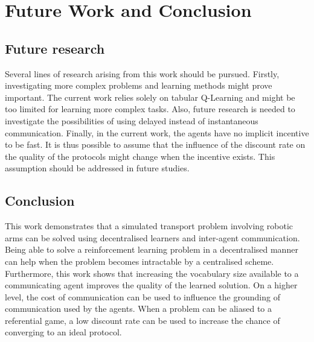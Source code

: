 \chapter{Future Work and Conclusion}
\label{chap:conclusion}

\section{Future research}

Several lines of research arising from this work should be pursued. Firstly, investigating more complex problems and learning methods might prove important. The current work relies solely on tabular Q-Learning and might be too limited for learning more complex tasks. Also, future research is needed to investigate the possibilities of using delayed instead of instantaneous communication. Finally, in the current work, the agents have no implicit incentive to be fast. It is thus possible to assume that the influence of the discount rate on the quality of the protocols might change when the incentive exists. This assumption should be addressed in future studies.

\section{Conclusion}

This work demonstrates that a simulated transport problem involving robotic arms can be solved using decentralised learners and inter-agent communication. Being able to solve a reinforcement learning problem in a decentralised manner can help when the problem becomes intractable by a centralised scheme. Furthermore, this work shows that increasing the vocabulary size available to a communicating agent improves the quality of the learned solution. On a higher level, the cost of communication can be used to influence the grounding of communication used by the agents. When a problem can be aliased to a referential game, a low discount rate can be used to increase the chance of converging to an ideal protocol.


